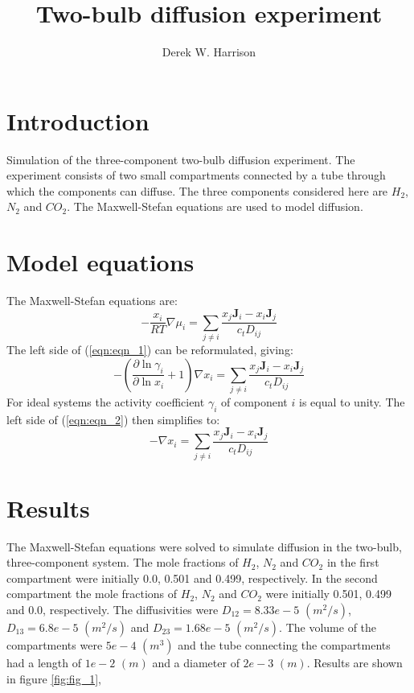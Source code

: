 \documentclass[11]{report}
\begin{document}
\author{Derek W. Harrison}
\title{Two-bulb diffusion experiment}
\maketitle

\section*{Introduction}
Simulation of the three-component two-bulb diffusion experiment. The experiment consists of two small compartments connected by a tube through which the components can diffuse. The three components considered here are $H_2$, $N_2$ and $CO_2$. The Maxwell-Stefan equations are used to model diffusion. 

\section*{Model equations}
The Maxwell-Stefan equations are:
\begin{equation}
\label{eqn:eqn_1}
-\frac{x_i}{RT} \nabla \mu_i = \sum_{j \neq i} \frac{x_j \textbf{J}_i - x_i \textbf{J}_j}{c_t D_{ij}}
\end{equation}
The left side of (\ref{eqn:eqn_1}) can be reformulated, giving:
\begin{equation}
\label{eqn:eqn_2}
-\left( \frac{\partial \ln{\gamma_i}}{\partial \ln{x_i}} + 1 \right) \nabla x_i = \sum_{j \neq i} \frac{x_j \textbf{J}_i - x_i \textbf{J}_j}{c_t D_{ij}}
\end{equation}
For ideal systems the activity coefficient $\gamma_i$ of component $i$ is equal to unity. The left side of (\ref{eqn:eqn_2}) then simplifies to:
\begin{equation}
\label{eqn:eqn_3}
- \nabla x_i = \sum_{j \neq i} \frac{x_j \textbf{J}_i - x_i \textbf{J}_j}{c_t D_{ij}}
\end{equation}

\section*{Results}
The Maxwell-Stefan equations were solved to simulate diffusion in the two-bulb, three-component system. The mole fractions of $H_2$, $N_2$ and $CO_2$ in the first compartment were initially 0.0, 0.501 and 0.499, respectively. In the second compartment the mole fractions of $H_2$, $N_2$ and $CO_2$ were initially 0.501, 0.499 and 0.0, respectively. The diffusivities were $D_{12} = 8.33e-5$  $(m^2/s)$, $D_{13} = 6.8e-5$ $(m^2/s)$ and $D_{23} = 1.68e-5$ $(m^2/s)$. The volume of the compartments were $5e-4$ $(m^3)$ and the tube connecting the compartments had a length of $1e-2$ $(m)$ and a diameter of $2e-3$ $(m)$. Results are shown in figure \ref{fig:fig_1}, 
\end{document}
